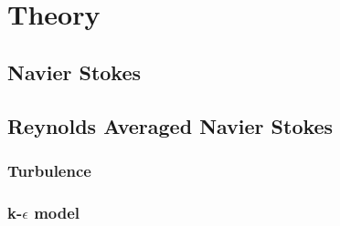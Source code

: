 \section{Theory}
\label{theory}
\subsection{Navier Stokes}
\subsection{Reynolds Averaged Navier Stokes}
\subsubsection{Turbulence}
\subsubsection{k-\texorpdfstring{$\epsilon$}{epsilon} model}

